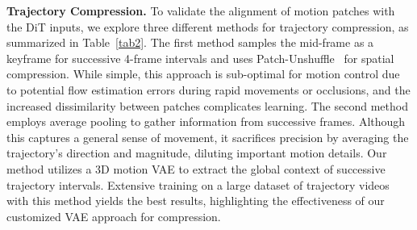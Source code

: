 \noindent \textbf{Trajectory Compression.} To validate the alignment of motion patches with the DiT inputs, we explore three different methods for trajectory compression, as summarized in Table~\ref{tab2}. The first method samples the mid-frame as a keyframe for successive 4-frame intervals and uses Patch-Unshuffle~\cite{jang2023pucapatchunshufflechannelattention} for spatial compression. While simple, this approach is sub-optimal for motion control due to potential flow estimation errors during rapid movements or occlusions, and the increased dissimilarity between patches complicates learning. The second method employs average pooling to gather information from successive frames. Although this captures a general sense of movement, it sacrifices precision by averaging the trajectory's direction and magnitude, diluting important motion details. Our method utilizes a 3D motion VAE to extract the global context of successive trajectory intervals. 
Extensive training on a large dataset of trajectory videos with this method yields the best results, highlighting the effectiveness of our customized VAE approach for compression.





